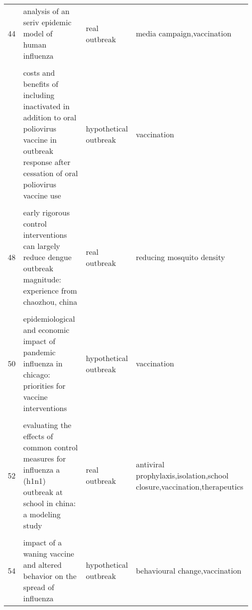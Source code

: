 \documentclass[
]{article}
\begin{document}
\begin{landscape}
\begin{longtable}{l>{\raggedright\arraybackslash}p{3cm}l>{\raggedright\arraybackslash}p{8cm}}
44 & analysis of an seriv epidemic model of human influenza & real outbreak & media campaign,vaccination\\
\cellcolor{gray!6}{45} & \cellcolor{gray!6}{control strategies of avian influenza pandemic model with time delay} & \cellcolor{gray!6}{hypothetical outbreak} & \cellcolor{gray!6}{disease control}\\
\addlinespace
46 & costs and benefits of including inactivated in addition to oral poliovirus vaccine in outbreak response after cessation of oral poliovirus vaccine use & hypothetical outbreak & vaccination\\
\cellcolor{gray!6}{47} & \cellcolor{gray!6}{deriving effective vaccine allocation strategies for pandemic influenza: comparison of an agent-based simulation and a compartmental model} & \cellcolor{gray!6}{hypothetical outbreak} & \cellcolor{gray!6}{vaccination}\\
48 & early rigorous control interventions can largely reduce dengue outbreak magnitude: experience from chaozhou, china & real outbreak & reducing mosquito density\\
\cellcolor{gray!6}{49} & \cellcolor{gray!6}{effects of reactive social distancing on the 1918 influenza pandemic} & \cellcolor{gray!6}{real outbreak} & \cellcolor{gray!6}{behavioural change}\\
50 & epidemiological and economic impact of pandemic influenza in chicago: priorities for vaccine interventions & hypothetical outbreak & vaccination\\
\addlinespace
\cellcolor{gray!6}{51} & \cellcolor{gray!6}{estimating direct and indirect protective effect of influenza vaccination in the united states} & \cellcolor{gray!6}{real outbreak} & \cellcolor{gray!6}{vaccination}\\
52 & evaluating the effects of common control measures for influenza a (h1n1) outbreak at school in china: a modeling study & real outbreak & antiviral prophylaxis,isolation,school closure,vaccination,therapeutics\\
\cellcolor{gray!6}{53} & \cellcolor{gray!6}{evaluation of strategies to control a potential outbreak of foot-and-mouth disease in sweden} & \cellcolor{gray!6}{hypothetical outbreak} & \cellcolor{gray!6}{culling,vaccination,movement restriction,national standstill,protection zones,surveillance zones}\\
54 & impact of a waning vaccine and altered behavior on the spread of influenza & hypothetical outbreak & behavioural change,vaccination\\

\end{longtable}
\end{landscape}
\end{document}
